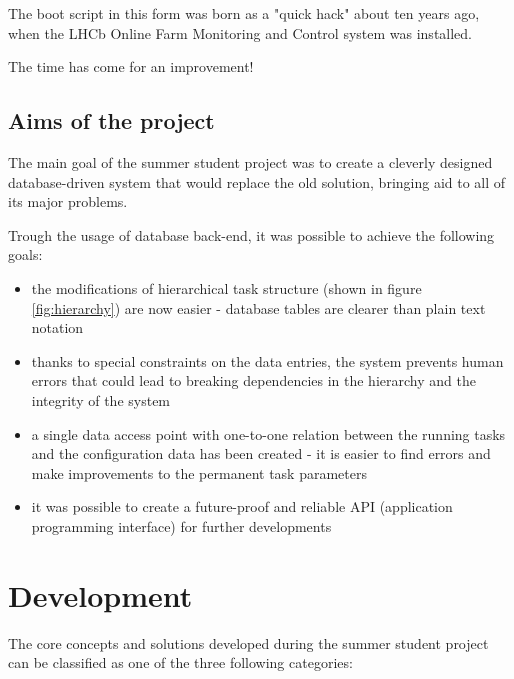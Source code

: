 \documentclass{customization}
\begin{document}
\noindent
The boot script in this form was born as a "quick hack" about ten years ago, when the LHCb Online Farm Monitoring and Control system was installed.
\newline

\noindent
The time has come for an improvement!


\subsection{Aims of the project}
\hspace{0.6cm}

The main goal of the summer student project was to create a cleverly designed database-driven system that would replace the old solution, bringing aid to all of its major problems.
\newline

\newpage
\noindent
Trough the usage of database back-end, it was possible to achieve the following goals:

\begin{itemize}
    \item the modifications of hierarchical task structure (shown in figure \ref{fig:hierarchy}) are now easier - database tables are clearer than plain text notation
    \item thanks to special constraints on the data entries, the system prevents human errors that could lead to breaking dependencies in the hierarchy and the integrity of the system
    \item a single data access point with one-to-one relation between the running tasks and the configuration data has been created - it is easier to find errors and make improvements to the permanent task parameters
    \item it was possible to create a future-proof and reliable API (application programming interface) for further developments
\end{itemize}


\section{Development}
\hspace{0.6cm}

The core concepts and solutions developed during the summer student project can be classified as one of the three following categories:
\end{document}
